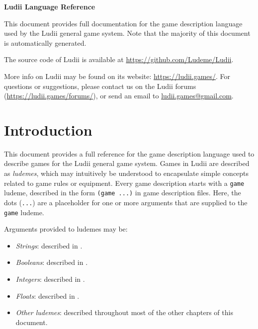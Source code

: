 \documentclass[10pt,twoside]{report}
\begin{document}
\begin{centering}


\thispagestyle{empty}

{\Large \bf Ludii Language Reference}

\end{centering}

\phantom{}

\noindent
This document provides full documentation for the game description language used by the Ludii general game system. Note that the majority of this document is automatically generated. 

The source code of Ludii is available at \url{https://github.com/Ludeme/Ludii}.

More info on Ludii may be found on its website: \url{https://ludii.games/}. For questions or suggestions, please contact us on the Ludii forums (\url{https://ludii.games/forums/}), or send an email to \href{mailto:ludii.games@gmail.com}{ludii.games@gmail.com}.



{
\tableofcontents
}


\chapter{Introduction}

\fancyhead[LE]{\thepage}
\fancyhead[RO]{\thepage}
\fancyhead[C]{\leftmark {} - \rightmark}

This document provides a full reference for the game description language used to describe games for the Ludii general game system. Games in Ludii are described as {\it ludemes}, which may intuitively be understood to encapsulate simple concepts related to game rules or equipment. Every game description starts with a {\tt game} ludeme, described in the form \texttt{(game ...)} in game description files. Here, the dots (\texttt{...}) are a placeholder for one or more arguments that are supplied to the \texttt{game} ludeme. 

Arguments provided to ludemes may be:
\begin{itemize}
\item {\it Strings}: described in .
\item {\it Booleans}: described in .
\item {\it Integers}: described in .
\item {\it Floats}: described in .
\item {\it Other ludemes}: described throughout most of the other chapters of this document.
\end{itemize}
\end{document}
